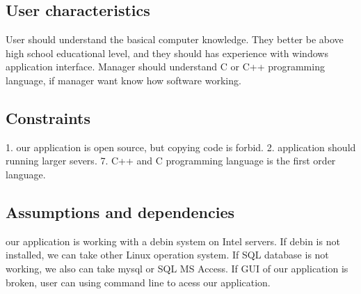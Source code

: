 \subsection{User characteristics}
User should understand the basical computer knowledge. They better be above high school educational level, 
and they should has experience with windows application interface. Manager should understand C or C++ programming language, if manager want know how software working.

\subsection{Constraints}
1. our application is open source, but copying code is forbid.
2. application should running larger severs.
7. C++ and C programming language is the first order language.

% 

\subsection{Assumptions and dependencies}
our application is working with a debin system on Intel servers. If debin is not installed, we can take other Linux operation system.
If SQL database is not working, we also can take mysql or SQL MS Access.
If GUI of our application is broken, user can using command line to acess our application.


